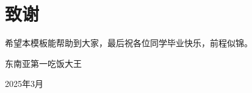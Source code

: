 \chapter*{\texorpdfstring{致\quad 谢}{致谢}}

希望本模板能帮助到大家，最后祝各位同学毕业快乐，前程似锦。





\begin{flushright}
	东南亚第一吃饭大王
	
	2025年3月
\end{flushright}


